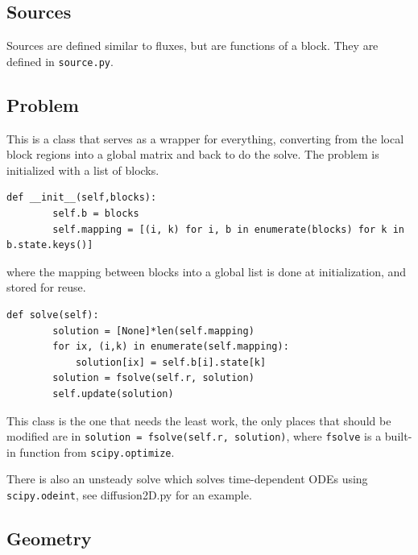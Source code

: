 \documentclass[11pt]{article}
\begin{document}
\subsection{Sources}
Sources are defined similar to fluxes, but are functions of a block. They are defined in \lstinline{source.py}.
\subsection{Problem}
This is a class that serves as a wrapper for everything, converting from the local block regions into a global matrix and back to do the solve. The problem is initialized with a list of blocks.
\begin{lstlisting}
def __init__(self,blocks):
		self.b = blocks
		self.mapping = [(i, k) for i, b in enumerate(blocks) for k in b.state.keys()]
\end{lstlisting}
where the mapping between blocks into a global list is done at initialization, and stored for reuse. 
\begin{lstlisting}
def solve(self):
		solution = [None]*len(self.mapping)
		for ix, (i,k) in enumerate(self.mapping):
			solution[ix] = self.b[i].state[k]
		solution = fsolve(self.r, solution)
		self.update(solution)
\end{lstlisting}
This class is the one that needs the least work, the only places that should be modified are in \lstinline{solution = fsolve(self.r, solution)}, where \lstinline{fsolve} is a built-in function from \lstinline{scipy.optimize}.

There is also an unsteady solve which solves time-dependent ODEs using \lstinline{scipy.odeint}, see diffusion2D.py for an example.

\subsection{Geometry}
\end{document}
